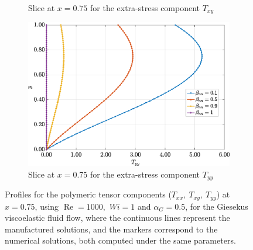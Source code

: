 \documentclass[preprint, 12pt]{elsarticle}
\begin{document}
\begin{figure}[H]
\begin{subfigure}[b]{.46\textwidth}
        \caption{Slice at $x=0.75$ for the extra-stress component $T_{xy}$}
        \label{fig_slice_y_txy_2nd_Case1_giesekus_x075}
    \end{subfigure}
    \begin{subfigure}[b]{.46\textwidth}
        \includegraphics[width=\textwidth]{Slice_x_Tog_Numerical_NormErr_2nd_Betann_1_Re_1000_Wi_1_epsilon_0_xi_0_alphaG_0.5_Dt_1e-06_at_0.05_tipsim_1_MMS_12_x0.75y0.75_Tyy.eps}
        \caption{Slice at $x=0.75$ for the extra-stress component $T_{yy}$}
        \label{fig_slice_y_tyy_2nd_Case1_giesekus_x075}
    \end{subfigure}
    \vspace{0.02cm}
    \caption{Profiles for the polymeric tensor components ($T_{xx},~T_{xy},~T_{yy}$) at $x=0.75$, using $\operatorname{Re}=1000,$ $Wi=1$ and $\alpha_{G} = 0.5$, for the Giesekus viscoelastic fluid flow, where the continuous lines represent the manufactured solutions, and the markers correspond to the numerical solutions, both computed under the same parameters.\label{fig_slice_Solution_txxxyyy_Giesekus_x075}}
\end{figure}
\end{document}
